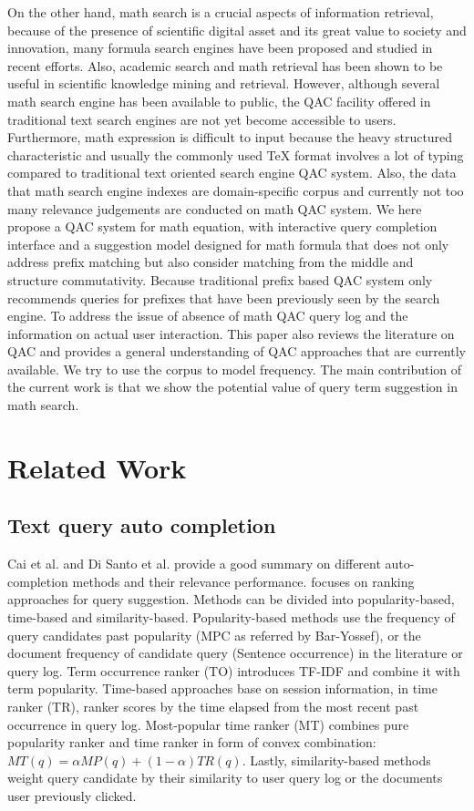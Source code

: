 \documentclass[12pt]{article} %
\begin{document}
On the other hand, math search is a crucial aspects of information retrieval, because of the presence of scientific digital asset and its great value to society and innovation, many formula search engines have been proposed and studied in recent efforts.
Also, academic search and math retrieval has been shown to be useful in scientific knowledge mining and retrieval.
However, although several math search engine has been available to public, the QAC facility offered in traditional text search engines are not yet become accessible to users.
Furthermore, math expression is difficult to input because the heavy structured characteristic and 
usually the commonly used TeX format involves a lot of typing compared to traditional text oriented search engine QAC system.
Also, the data that math search engine indexes are domain-specific corpus and currently not too many relevance judgements are conducted on math QAC system.
We here propose a QAC system for math equation,
with interactive query completion interface and a suggestion model designed for math formula that does not only address prefix matching but also consider matching from the middle and structure commutativity. Because traditional prefix based QAC system only recommends queries for prefixes that have been previously seen by the search engine.
To address the issue of absence of math QAC query log and the information on actual user interaction.
This paper also reviews the literature on QAC and provides a general understanding of QAC approaches that are currently available.
We try to use the corpus to model frequency.
The main contribution of the current work is that we show the potential value of query
term suggestion in math search.

\section{Related Work}
\subsection{Text query auto completion}
Cai et al. \cite{cai_survey_2016} and Di Santo et al.  \cite{di_santo_comparing_2015}
provide a good summary on different auto-completion methods and their relevance
performance.
\cite{di_santo_comparing_2015} focuses on ranking approaches for query suggestion.
Methods can be divided into popularity-based, time-based and similarity-based.
Popularity-based methods use the frequency of query candidates past popularity (MPC as referred by Bar-Yossef), or the document frequency of candidate query (Sentence occurrence) in the literature or
query log. Term occurrence ranker (TO) introduces TF-IDF and combine it with term popularity.
Time-based approaches base on session information, in time ranker (TR), ranker scores by the time elapsed from the most recent past occurrence in query log.
Most-popular time ranker (MT) combines pure popularity ranker and time ranker in form of convex combination: $MT(q) = 
\alpha MP(q) + (1-\alpha) TR(q)$.
Lastly, similarity-based methods weight query candidate by their similarity to user query log or the documents user previously clicked.
\end{document}

